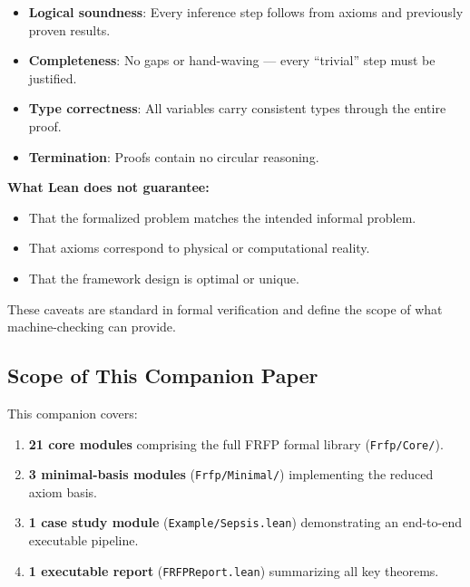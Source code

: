 \begin{itemize}
  \item \textbf{Logical soundness}: Every inference step follows from axioms and
        previously proven results.
  \item \textbf{Completeness}: No gaps or hand-waving --- every ``trivial'' step
        must be justified.
  \item \textbf{Type correctness}: All variables carry consistent types through
        the entire proof.
  \item \textbf{Termination}: Proofs contain no circular reasoning.
\end{itemize}

\textbf{What Lean does not guarantee:}

\begin{itemize}
  \item That the formalized problem matches the intended informal problem.
  \item That axioms correspond to physical or computational reality.
  \item That the framework design is optimal or unique.
\end{itemize}

These caveats are standard in formal verification and define the scope of what
machine-checking can provide.

\subsection{Scope of This Companion Paper}

This companion covers:

\begin{enumerate}
  \item \textbf{21 core modules} comprising the full FRFP formal library
        (\texttt{Frfp/Core/}).
  \item \textbf{3 minimal-basis modules} (\texttt{Frfp/Minimal/}) implementing
        the reduced axiom basis.
  \item \textbf{1 case study module} (\texttt{Example/Sepsis.lean}) demonstrating
        an end-to-end executable pipeline.
  \item \textbf{1 executable report} (\texttt{FRFPReport.lean}) summarizing all
        key theorems.
\end{enumerate}

